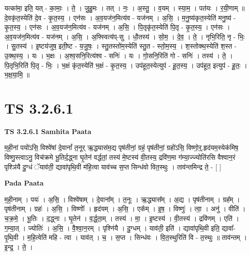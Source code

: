 \documentclass[17pt]{extarticle}
\begin{document}
यत्का॑मा॒ इति॒ यत् - का॒माः॒ । ते॒ । जु॒हु॒मः । तत् । नः॒ । अ॒स्तु॒ । व॒यम् । स्या॒म॒ । पत॑यः । र॒यी॒णाम् ॥ दे॒वकृ॑त॒स्येति॑ दे॒व - कृ॒त॒स्य॒ । एन॑सः । अ॒व॒यज॑न॒मित्य॑व - यज॑नम् । अ॒सि॒ । म॒नु॒ष्य॑कृत॒स्येति॑ मनु॒ष्य॑ - कृ॒त॒स्य॒ । एन॑सः । अ॒व॒यज॑न॒मित्य॑व - यज॑नम् । अ॒सि॒ । पि॒तृकृ॑त॒स्येति॑ पि॒तृ - कृ॒त॒स्य॒ । एन॑सः । अ॒व॒यज॑न॒मित्य॑व - यज॑नम् । अ॒सि॒ । अ॒फ्स्वित्य॑प्-सु । धौ॒तस्य॑ । सो॒म॒ । दे॒व॒ । ते॒ । नृभि॒रिति॒ नृ - भिः॒ । सु॒तस्य॑ । इ॒ष्टय॑जुष॒ इती॒ष्ट - य॒जु॒षः॒ । स्तु॒तस्तो॑म॒स्येति॑ स्तु॒त - स्तो॒म॒स्य॒ । श॒स्तोक्थ॒स्येति॑ श॒स्त - उ॒क्थ॒स्य॒ । यः । भ॒क्षः । अ॒श्व॒सनि॒रित्य॑श्व - सनिः॑ । यः । गो॒सनि॒रिति॑ गो - सनिः॑ । तस्य॑ । ते॒ । पि॒तृभि॒रिति॑ पि॒तृ - भिः॒ । भ॒क्षं कृ॑त॒स्येति॑ भ॒क्षं - कृ॒त॒स्य॒ । उप॑हूत॒स्येत्युप॑ - हू॒त॒स्य॒ । उप॑हूत॒ इत्युप॑ - हू॒तः॒ । भ॒क्ष॒या॒मि॒ ॥  \newline





\section{ TS 3.2.6.1 }

\textbf{TS 3.2.6.1 } \newline
\textbf{Samhita Paata} \newline

म॒ही॒नां पयो॑ऽसि॒ विश्वे॑षां दे॒वानां᳚ त॒नूर् ऋ॒द्ध्यास॑म॒द्य पृष॑तीनां॒ ग्रहं॒ पृष॑तीनां॒ ग्रहो॑ऽसि॒ विष्णो॒र्॒.हृद॑यम॒स्येक॑मिष॒ विष्णु॒स्त्वाऽनु॒ विच॑क्रमे भू॒तिर्द॒द्ध्ना घृ॒तेन॑ वर्द्धतां॒ तस्य॑ मे॒ष्टस्य॑ वी॒तस्य॒ द्रवि॑ण॒मा ग॑म्या॒ज्ज्योति॑रसि वैश्वान॒रं पृश्ञि॑यै दु॒ग्धं ॅयाव॑ती॒ द्यावा॑पृथि॒वी म॑हि॒त्वा याव॑च्च स॒प्त सिन्ध॑वो वित॒स्थुः । ताव॑न्तमिन्द्र ते॒ - [  ] \newline

\textbf{Pada Paata} \newline

म॒ही॒नाम् । पयः॑ । अ॒सि॒ । विश्वे॑षाम् । दे॒वाना᳚म् । त॒नूः । ऋ॒द्ध्यास᳚म् । अ॒द्य । पृष॑तीनाम् । ग्रह᳚म् । पृष॑तीनाम् । ग्रहः॑ । अ॒सि॒ । विष्णोः᳚ । हृद॑यम् । अ॒सि॒ । एक᳚म् । इ॒ष॒ । विष्णुः॑ । त्वा॒ । अनु॑ । वीति॑ । च॒क्र॒मे॒ । भू॒तिः । द॒द्ध्ना । घृ॒तेन॑ । व॒र्द्ध॒ता॒म् । तस्य॑ । मा॒ । इ॒ष्टस्य॑ । वी॒तस्य॑ । द्रवि॑णम् । एति॑ । ग॒म्या॒त् । ज्योतिः॑ । अ॒सि॒ । वै॒श्वा॒न॒रम् । पृश्नि॑यै । दु॒ग्धम् । याव॑ती॒ इति॑ । द्यावा॑पृथि॒वी इति॒ द्यावा᳚-पृ॒थि॒वी । म॒हि॒त्वेति॑ महि - त्वा । याव॑त् । च॒ । स॒प्त । सिन्ध॑वः । वि॒त॒स्थुरिति॑ वि - त॒स्थुः ॥ ताव॑न्तम् । इ॒न्द्र॒ । ते॒ ।  \newline
\end{document}
